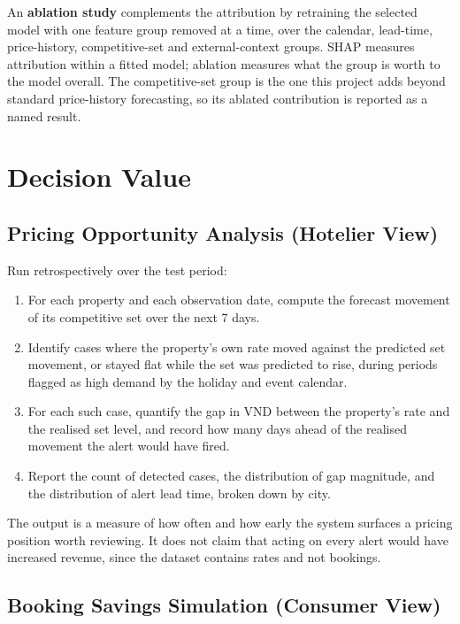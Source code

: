 An \textbf{ablation study} complements the attribution by retraining the selected model with one feature group removed at a time, over the calendar, lead-time, price-history, competitive-set and external-context groups. SHAP measures attribution within a fitted model; ablation measures what the group is worth to the model overall. The competitive-set group is the one this project adds beyond standard price-history forecasting, so its ablated contribution is reported as a named result.

\section{Decision Value}

\subsection{Pricing Opportunity Analysis (Hotelier View)}

Run retrospectively over the test period:

\begin{enumerate}[leftmargin=*]
    \item For each property and each observation date, compute the forecast movement of its competitive set over the next 7 days.
    \item Identify cases where the property's own rate moved against the predicted set movement, or stayed flat while the set was predicted to rise, during periods flagged as high demand by the holiday and event calendar.
    \item For each such case, quantify the gap in VND between the property's rate and the realised set level, and record how many days ahead of the realised movement the alert would have fired.
    \item Report the count of detected cases, the distribution of gap magnitude, and the distribution of alert lead time, broken down by city.
\end{enumerate}

The output is a measure of how often and how early the system surfaces a pricing position worth reviewing. It does not claim that acting on every alert would have increased revenue, since the dataset contains rates and not bookings.

\subsection{Booking Savings Simulation (Consumer View)}

